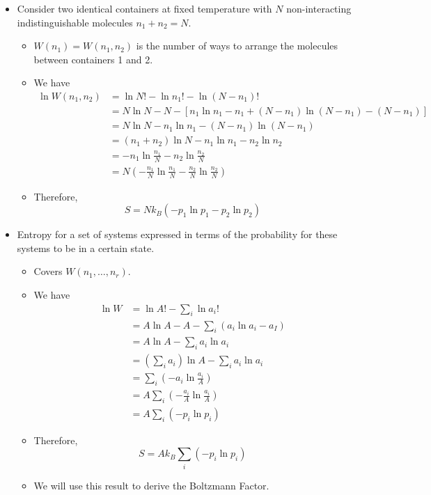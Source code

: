 \documentclass[../notes.tex]{subfiles}
\begin{document}
\begin{itemize}
    \item Consider two identical containers at fixed temperature with $N$ non-interacting indistinguishable molecules $n_1+n_2=N$.
    \begin{itemize}
        \item $W(n_1)=W(n_1,n_2)$ is the number of ways to arrange the molecules between containers 1 and 2.
        \item We have
        \begin{align*}
            \ln W(n_1,n_2) &= \ln N!-\ln n_1!-\ln(N-n_1)!\\
            &= N\ln N-N-[n_1\ln n_1-n_1+(N-n_1)\ln(N-n_1)-(N-n_1)]\\
            &= N\ln N-n_1\ln n_1-(N-n_1)\ln(N-n_1)\\
            &= (n_1+n_2)\ln N-n_1\ln n_1-n_2\ln n_2\\
            &= -n_1\ln\frac{n_1}{N}-n_2\ln\frac{n_2}{N}\\
            &= N\left( -\frac{n_1}{N}\ln\frac{n_1}{N}-\frac{n_2}{N}\ln\frac{n_2}{N} \right)
        \end{align*}
        \item Therefore,
        \begin{equation*}
            S = Nk_B(-p_1\ln p_1-p_2\ln p_2)
        \end{equation*}
    \end{itemize}
    \item Entropy for a set of systems expressed in terms of the probability for these systems to be in a certain state.
    \begin{itemize}
        \item Covers $W(n_1,\dots,n_r)$.
        \item We have
        \begin{align*}
            \ln W &= \ln A!-\sum_i\ln a_i!\\
            &= A\ln A-A-\sum_i(a_i\ln a_i-a_I)\\
            &= A\ln A-\sum_i a_i\ln a_i\\
            &= \left( \sum_ia_i \right)\ln A-\sum_ia_i\ln a_i\\
            &= \sum_i\left( -a_i\ln\frac{a_i}{A} \right)\\
            &= A\sum_i\left( -\frac{a_i}{A}\ln\frac{a_i}{A} \right)\\
            &= A\sum_i(-p_i\ln p_i)
        \end{align*}
        \item Therefore,
        \begin{equation*}
            S = Ak_B\sum_i(-p_i\ln p_i)
        \end{equation*}
        \item We will use this result to derive the Boltzmann Factor.
    \end{itemize}
\end{itemize}
\end{document}
